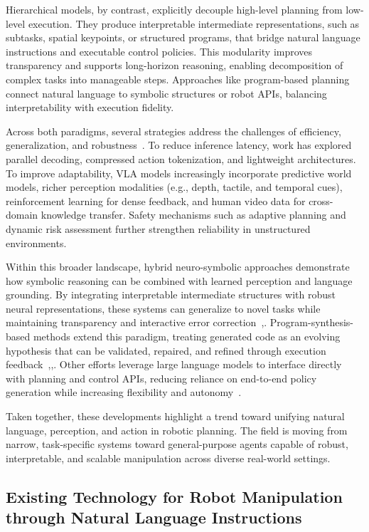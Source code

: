 \documentclass[12pt]{extarticle}
\begin{document}
Hierarchical models, by contrast, explicitly decouple high-level planning from low-level execution. They produce interpretable intermediate representations, such as subtasks, spatial keypoints, or structured programs, that bridge natural language instructions and executable control policies. This modularity improves transparency and supports long-horizon reasoning, enabling decomposition of complex tasks into manageable steps. Approaches like program-based planning connect natural language to symbolic structures or robot APIs, balancing interpretability with execution fidelity.

Across both paradigms, several strategies address the challenges of efficiency, generalization, and robustness~\cite{vla-in-robot}. To reduce inference latency, work has explored parallel decoding, compressed action tokenization, and lightweight architectures. To improve adaptability, VLA models increasingly incorporate predictive world models, richer perception modalities (e.g., depth, tactile, and temporal cues), reinforcement learning for dense feedback, and human video data for cross-domain knowledge transfer. Safety mechanisms such as adaptive planning and dynamic risk assessment further strengthen reliability in unstructured environments.

Within this broader landscape, hybrid neuro-symbolic approaches demonstrate how symbolic reasoning can be combined with learned perception and language grounding. By integrating interpretable intermediate structures with robust neural representations, these systems can generalize to novel tasks while maintaining transparency and interactive error correction~\cite{enhancing-interpret},\cite{learning-neuro-symbolic}. Program-synthesis-based methods extend this paradigm, treating generated code as an evolving hypothesis that can be validated, repaired, and refined through execution feedback~\cite{hycodepolicy},\cite{code-as-policies},\cite{code-as-symbolic-planner}. Other efforts leverage large language models to interface directly with planning and control APIs, reducing reliance on end-to-end policy generation while increasing flexibility and autonomy~\cite{audere}.

Taken together, these developments highlight a trend toward unifying natural language, perception, and action in robotic planning. The field is moving from narrow, task-specific systems toward general-purpose agents capable of robust, interpretable, and scalable manipulation across diverse real-world settings.


\subsection{Existing Technology for Robot Manipulation through Natural Language Instructions}
\end{document}
